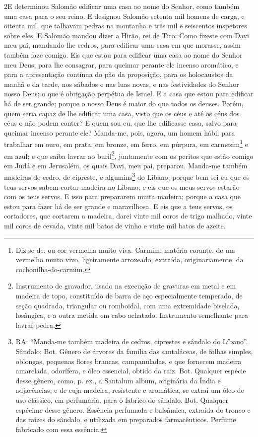 \medskip

\lettrine{2} E determinou Salomão edificar uma casa ao nome do
Senhor, como também uma casa para o seu reino. E designou
Salomão setenta mil homens de carga, e oitenta mil, que talhavam
pedras na montanha e três mil e seiscentos inspetores sobre eles.
E Salomão mandou dizer a Hirão, rei de Tiro: Como fizeste com
Davi meu pai, mandando-lhe cedros, para edificar uma casa em que
morasse, assim também faze comigo. Eis que estou para edificar
uma casa ao nome do Senhor meu Deus, para lhe consagrar, para
queimar perante ele incenso aromático, e para a apresentação
contínua do pão da proposição, para os holocaustos da manhã e da
tarde, nos sábados e nas luas novas, e nas festividades do Senhor
nosso Deus; o que é obrigação perpétua de Israel. E a casa que
estou para edificar há de ser grande; porque o nosso Deus é maior do
que todos os deuses. Porém, quem seria capaz de lhe edificar uma
casa, visto que os céus e até os céus dos céus o não podem conter? E
quem sou eu, que lhe edificasse casa, salvo para queimar incenso
perante ele? Manda-me, pois, agora, um homem hábil para
trabalhar em ouro, em prata, em bronze, em ferro, em púrpura, em
carmesim\footnote{Diz-se de, ou cor vermelha muito viva. Carmim:
matéria corante, de um vermelho muito vivo, ligeiramente arroxeado,
extraída, originariamente, da cochonilha-do-carmim.} e em azul; e
que saiba lavrar ao buril\footnote{Instrumento de gravador, usado na
execução de gravuras em metal e em madeira de topo, constituído de
barra de aço especialmente temperado, de seção quadrada, triangular
ou romboidal, com uma extremidade biselada, losângica, e a outra
metida em cabo achatado. Instrumento semelhante para lavrar pedra.},
juntamente com os peritos que estão comigo em Judá e em Jerusalém,
os quais Davi, meu pai, preparou. Manda-me também madeiras de
cedro, de cipreste, e algumins\footnote{RA: ``Manda-me também
madeira de cedros, ciprestes e sândalo do Líbano''. Sândalo: Bot.
Gênero de árvores da família das santaláceas, de folhas simples,
oblongas, pequenas flores brancas, campanuladas, e que fornecem
madeira amarelada, odorífera, e óleo essencial, obtido da raiz. Bot.
Qualquer espécie desse gênero, como, p. ex., a Santalum album,
originária da Índia e adjacências, e de cuja madeira, resistente e
aromática, se extrai um óleo de uso clássico, em perfumaria, para o
fabrico do sândalo. Bot. Qualquer espécime desse gênero. Essência
perfumada e balsâmica, extraída do tronco e das raízes do sândalo, e
utilizada em preparados farmacêuticos. Perfume fabricado com essa
essência.} do Líbano; porque bem sei eu que os teus servos sabem
cortar madeira no Líbano; e eis que os meus servos estarão com os
teus servos. E isso para prepararem muita madeira; porque a casa
que estou para fazer há de ser grande e maravilhosa. E eis
que a teus servos, os cortadores, que cortarem a madeira, darei
vinte mil coros de trigo malhado, vinte mil coros de cevada, vinte
mil batos de vinho e vinte mil batos de azeite.

